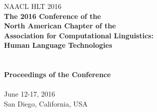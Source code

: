 \documentclass[11pt]{article}
\begin{document}
  \begin{center}
  \LARGE NAACL HLT 2016\\
  \vspace*{55mm}
    {\bf
    \LARGE
    The 2016 Conference of the \\
    North American Chapter of the \\
    Association for Computational Linguistics: \\
    Human Language Technologies \\

    \hspace*{1cm}\\ \hspace*{1cm} \\

    \vspace{2cm}
    \LARGE
    Proceedings of the Conference\\
    \vspace{2cm}
    \hspace*{1cm}} \\ %
    \vspace{43mm}
    \LARGE
    June 12-17, 2016\\
    San Diego, California, USA

  \end{center}
\end{document}
